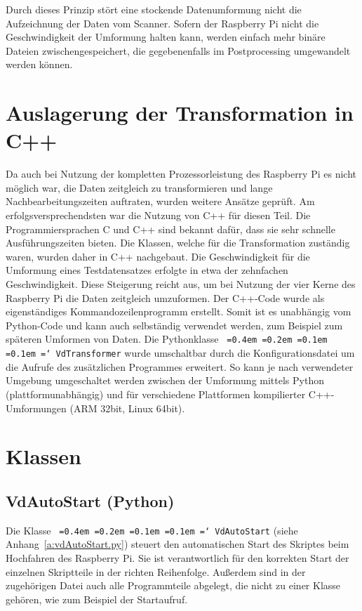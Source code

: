 \documentclass[a4paper,12pt,bibliography=totoc, listof=totoc,titlepage,pointlessnumbers]{scrreprt}
\newcommand*\justify{%
  \fontdimen2\font=0.4em%
  \fontdimen3\font=0.2em%
  \fontdimen4\font=0.1em%
  \fontdimen7\font=0.1em%
  \hyphenchar\font=`\-%
}
\newcommand{\code}[1]{\texttt{\justify{#1}}}
\begin{document}
Durch dieses Prinzip stört eine stockende Datenumformung nicht die Aufzeichnung der Daten vom Scanner. Sofern der Raspberry Pi nicht die Geschwindigkeit der Umformung halten kann, werden einfach mehr binäre Dateien zwischengespeichert, die gegebenenfalls im Postprocessing umgewandelt werden können.

\section{Auslagerung der Transformation in C++}
Da auch bei Nutzung der kompletten Prozessorleistung des Raspberry Pi es nicht möglich war, die Daten zeitgleich zu transformieren und lange Nachbearbeitungszeiten auftraten, wurden weitere Ansätze geprüft. Am erfolgsversprechendsten war die Nutzung von C++ für diesen Teil. Die Programmiersprachen C und C++ sind bekannt dafür, dass sie sehr schnelle Ausführungszeiten bieten. Die Klassen, welche für die Transformation zuständig waren, wurden daher in C++ nachgebaut. Die Geschwindigkeit für die Umformung eines Testdatensatzes erfolgte in etwa der zehnfachen Geschwindigkeit. Diese Steigerung reicht aus, um bei Nutzung der vier Kerne des Raspberry Pi die Daten zeitgleich umzuformen. Der C++-Code wurde als eigenständiges Kommandozeilenprogramm erstellt. Somit ist es unabhängig vom Python-Code und kann auch selbständig verwendet werden, zum Beispiel zum späteren Umformen von Daten.
Die Pythonklasse \code{VdTransformer} wurde umschaltbar durch die Konfigurationsdatei um die Aufrufe des zusätzlichen Programmes erweitert. So kann je nach verwendeter Umgebung umgeschaltet werden zwischen der Umformung mittels Python (plattformunabhängig) und für verschiedene Plattformen kompilierter C++-Umformungen (ARM 32bit, Linux 64bit).

\section{Klassen}
\label{s:klassen}

\subsection{VdAutoStart (Python)}
Die Klasse \code{VdAutoStart} (siehe Anhang~\ref{a:vdAutoStart.py}) steuert den automatischen Start des Skriptes beim Hochfahren des Raspberry Pi. Sie ist verantwortlich für den korrekten Start der einzelnen Skriptteile in der richten Reihenfolge. Außerdem sind in der zugehörigen Datei auch alle Programmteile abgelegt, die nicht zu einer Klasse gehören, wie zum Beispiel der Startaufruf.
\end{document}
